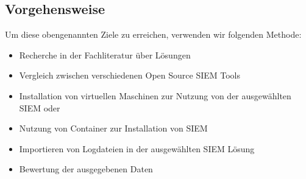 \subsection{Vorgehensweise}
Um diese obengenannten Ziele zu erreichen, verwenden wir folgenden Methode:

\begin{itemize}[noitemsep]
   \item Recherche in der Fachliteratur über  Lösungen
   \item Vergleich zwischen verschiedenen \gls{Open Source} \gls{SIEM} Tools
   \item Installation von virtuellen Maschinen zur Nutzung von der ausgewählten \gls{SIEM} oder  
   \item Nutzung von Container zur Installation von \gls{SIEM}
   \item Importieren von Logdateien in der ausgewählten \gls{SIEM} Lösung
   \item Bewertung der ausgegebenen Daten
\end{itemize}

